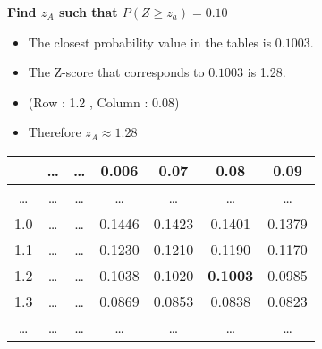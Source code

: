 \noindent \textbf{Find $z_A$ such that $ P(Z \geq z_a) = 0.10$}
\begin{itemize}
\item The closest probability value in the tables is $0.1003$.
\item The Z-score that corresponds to $0.1003$ is 1.28.
\item (Row : 1.2 , Column : 0.08)
\item Therefore $z_A  \approx 1.28$
\end{itemize}
\newpage
\begin{table}[ht]
\centering %
\begin{tabular}{|c|| c| c| c| c| c| c|} %
\hline %
& \ldots & \ldots & 0.006 &0.07&0.08&0.09 \\
\hline \hline%
\ldots & \ldots & \ldots &\ldots& \ldots &\ldots&\dots \\ %
1.0 & \ldots & \ldots &0.1446& 0.1423 &0.1401&0.1379 \\ %
1.1 & \ldots & \ldots&0.1230& 0.1210 &0.1190&0.1170 \\ %
1.2 & \ldots & \ldots&0.1038 & 0.1020 &\textbf{0.1003}&0.0985\\
1.3 & \ldots & \ldots &0.0869& 0.0853 &0.0838&0.0823 \\ %
\ldots & \ldots &\ldots&\ldots & \ldots &\ldots&\ldots\\
\hline %
\end{tabular}
\end{table}

